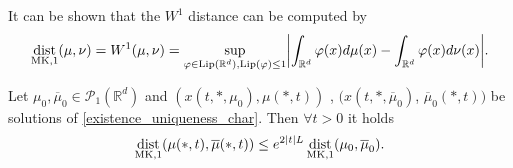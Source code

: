 \begin{remark}
 It can be shown that the $W^{1} $  distance can be computed by
 \begin{align*}
   \dist_{\text{MK},1}(\mu ,\nu ) = W^{1}(\mu ,\nu )  = \sup_{\phi \in \text{Lip}(\mathbb{R}^{d} ),\text{Lip}(\phi )\le 1} \abs*{\int_{\mathbb{R}^{d} } \phi(x) d\mu (x) - \int_{\mathbb{R}^{d} }\phi(x) d\nu(x)}
 .\end{align*}
\end{remark}
\begin{theorem}\label{dobrushin_stability}
  Let $\mu_0,\overline{\mu }_0 \in  \mathcal{P}_1(\mathbb{R}^{d} ) $  and
  $(x(t,*,\mu_0),\mu(*,t))$ , $(x(t,*,\overline{\mu}_0)$, $\overline{\mu}_0 (*,t))$ be solutions of 
  \autoref{existence_uniqueness_char}. Then $\forall t >0$ it holds 
  \begin{align*}
    \operatorname*{dist}_{\text{MK},1}(\mu(*,t),\overline{\mu }(*,t) ) \le e^{2 \lvert t\rvert L} \operatorname*{dist}_{\text{MK},1} (\mu_0,\overline{\mu }_0 )
  .\end{align*}
\end{theorem}
